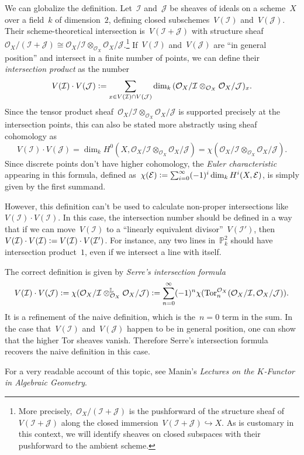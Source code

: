 \documentclass{amsart}
\newcommand*{\sectionsummary}[1]{\etoctoccontentsline{sectionsummary}{#1}}
\theoremstyle{definition}
\theoremstyle{plain}
\theoremstyle{remark}
\newcommand{\C}{\mathcal{C}}
\newcommand{\E}{\mathcal{E}}
\renewcommand{\O}{\mathcal{O}}
\newcommand{\I}{\mathcal{I}}
\newcommand{\J}{\mathcal{J}}
\newcommand{\RR}{\mathbb{R}}
\newcommand{\LL}{\mathbb{L}}
\newcommand{\PP}{\mathbb{P}}
\newcommand{\Tor}{\mathrm{Tor}}
\newcommand{\?}{\,{:}\,}
\renewcommand{\_}{\mathpunct{.}\,}
\newcommand{\ip}{\cdot}
\newcommand{\defeq}{\vcentcolon=}
\begin{document}
We can globalize the definition. Let~$\I$ and~$\J$ be sheaves of ideals on a
scheme~$X$ over a field~$k$ of dimension~$2$, defining closed
subschemes~$V(\I)$ and~$V(\J)$.  Their scheme-theoretical intersection is~$V(\I
+ \J)$ with structure sheaf~$\O_X/(\I + \J) \cong \O_X/\I \otimes_{\O_X}
\O_X/\J$.\footnote{More precisely,~$\O_X/(\I + \J)$ is the pushforward of the
structure sheaf of~$V(\I + \J)$ along the closed immersion~$V(\I + \J)
\hookrightarrow X$. As is customary in this context, we will identify sheaves
on closed subspaces with their pushforward to the ambient scheme.} If~$V(\I)$
and~$V(\J)$ are ``in general position'' and intersect in a finite number of
points, we can define their \emph{intersection product} as the number
\[ V(\I) \ip V(\J) \defeq \sum_{x \in V(\I) \cap V(\J)}
  \dim_k\, (\O_X/\I \otimes_{\O_X} \O_X/\J)_x. \]
Since the tensor product sheaf~$\O_X/\I \otimes_{\O_X} \O_X/\J$ is supported
precisely at the intersection points, this can also be stated more abstractly
using sheaf cohomology as
\[ V(\I) \ip V(\J) = \dim_k H^0(X, \O_X/\I \otimes_{\O_X} \O_X/\J) =
\chi(\O_X/\I \otimes_{\O_X} \O_X/\J). \]
Since discrete points don't have higher cohomology, the \emph{Euler
characteristic} appearing in this formula, defined as~$\chi(\E) \defeq
\sum_{i=0}^\infty (-1)^i \dim_k H^i(X, \E)$, is simply given by the first
summand.

However, this definition can't be used to calculate non-proper intersections
like $V(\I) \ip V(\I)$. In this case, the intersection number should be defined in a way that if we can
move~$V(\I)$ to a ``linearly equivalent divisor''~$V(\I')$, then~$V(\I) \ip
V(\I) \defeq V(\I) \ip V(\I')$. For instance, any two lines in~$\PP^2_k$ should
have intersection product~$1$, even if we intersect a line with itself.

The correct definition is given by \emph{Serre's intersection formula}
\[ V(\I) \ip V(\J) \defeq \chi(\O_X/\I \otimes^\LL_{\O_X} \O_X/\J) \defeq
  \sum_{n=0}^\infty (-1)^n \chi(\Tor_n^{\O_X}(\O_X/\I,\O_X/\J)). \]
It is a refinement of the naive definition, which is the~$n = 0$ term in the
sum. In the case that~$V(\I)$ and~$V(\J)$ happen to be in general position, one can
show that the higher Tor sheaves vanish. Therefore Serre's intersection formula
recovers the naive definition in this case.

For a very readable account of this topic, see Manin's \emph{Lectures on the
$K$-Functor in Algebraic Geometry}.

%
\end{document}
